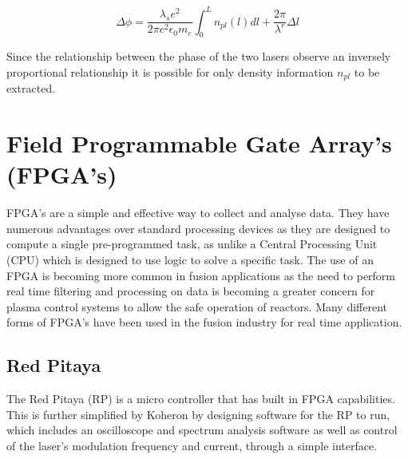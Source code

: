 \documentclass[12pt,a4paper,oneside]{report}
\begin{document}
\begin{equation}
	\Delta\phi = \frac{\lambda_{s} e^{2}}{2 \pi c^{2} \epsilon_{0} m_{e}} \int_{0}^{L} n_{pl} (l) dl + \frac{2\pi}{\lambda^{r}} \Delta l
	\label{eq:heterophasediff}
\end{equation}

Since the relationship between the phase of the two lasers observe an inversely proportional relationship it is possible for only density information $n_{pl}$ to be extracted.

	\section{Field Programmable Gate Array's (FPGA's)}
FPGA's are a simple and effective way to collect and analyse data. They have numerous advantages over standard processing devices as they are designed to compute a single pre-programmed task, as unlike a Central Processing Unit (CPU) which is designed to use logic to solve a specific task. The use of an FPGA is becoming more common in fusion applications as the need to perform real time filtering \cite{Naylor2010AnMAST} and processing on data is becoming a greater concern for plasma control systems to allow the safe operation of reactors. Many different forms of FPGA's have been used in the fusion industry for real time application.
	\subsection{Red Pitaya}
    
The Red Pitaya (RP) \cite{Leban2014RedManual} is a micro controller that has built in FPGA capabilities. This is further simplified by Koheron by designing software for the RP to run, which includes an oscilloscope and spectrum analysis software as well as control of the laser's modulation frequency and current, through a simple interface.

\end{document}
